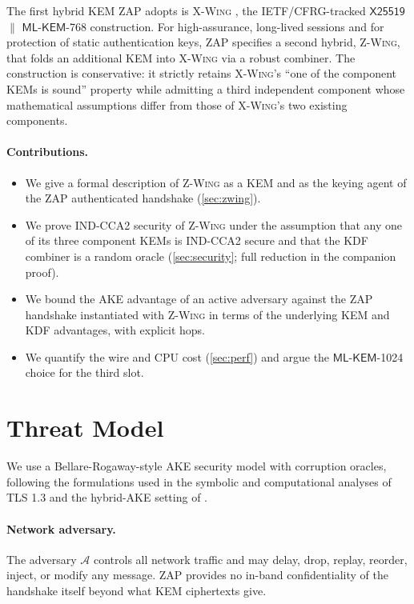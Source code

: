 \documentclass[11pt,a4paper]{article}
\theoremstyle{definition}
\theoremstyle{remark}
\newcommand{\xwing}{\textsc{X-Wing}}
\newcommand{\zwing}{\textsc{Z-Wing}}
\newcommand{\zap}{\textsc{ZAP}}
\newcommand{\mlkem}{\ensuremath{\mathsf{ML\text{-}KEM}}}
\newcommand{\xtf}{\ensuremath{\mathsf{X25519}}}
\begin{document}
The first hybrid KEM \zap{} adopts is \xwing{} \cite{xwing2024},
the IETF/CFRG-tracked \xtf{} $\parallel$ \mlkem{}-768 construction.
For high-assurance, long-lived sessions and for protection of static
authentication keys, \zap{} specifies a second hybrid, \zwing{}, that
folds an additional KEM into \xwing{} via a robust combiner. The
construction is conservative: it strictly retains \xwing{}'s ``one of the
component KEMs is sound'' property while admitting a third independent
component whose mathematical assumptions differ from those of \xwing{}'s
two existing components.

\paragraph{Contributions.}
\begin{itemize}
\item We give a formal description of \zwing{} as a KEM and as the keying
agent of the \zap{} authenticated handshake (\cref{sec:zwing}).
\item We prove IND-CCA2 security of \zwing{} under the assumption that any one
of its three component KEMs is IND-CCA2 secure and that the KDF combiner is a
random oracle (\cref{sec:security}; full reduction in the companion proof).
\item We bound the AKE advantage of an active adversary against the
\zap{} handshake instantiated with \zwing{} in terms of the underlying KEM and
KDF advantages, with explicit hops.
\item We quantify the wire and CPU cost (\cref{sec:perf}) and argue the
\mlkem{}-1024 choice for the third slot.
\end{itemize}

\section{Threat Model}\label{sec:tm}

We use a Bellare-Rogaway-style AKE security model with corruption oracles,
following the formulations used in the symbolic and computational analyses
of TLS 1.3 \cite{cremers2017ake} and the hybrid-AKE setting of
\cite{bindel2019hybrid}.

\paragraph{Network adversary.} The adversary $\mathcal{A}$ controls all
network traffic and may delay, drop, replay, reorder, inject, or modify any
message. \zap{} provides no in-band confidentiality of the handshake itself
beyond what KEM ciphertexts give.
\end{document}
